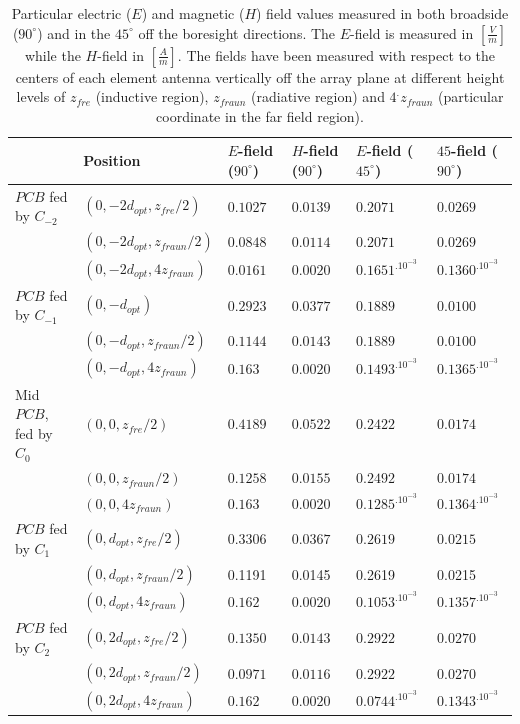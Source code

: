 \documentclass[10 pt,a4paper,twocolumn]{article}
\begin{document}
{\begin{table}[bt!]
\begin{center}
{\begin{tabular}{|m{4cm}|m{2.6cm}|m{2cm}|m{2cm}|m{2.3cm}|m{2.3cm}|}
				& Position & $E$-field ($90^\circ$) & $H$-field ($90^\circ$) & $E$-field ($45^\circ$) & $45$-field ($90^\circ$) \\
				\hline 
				$PCB$ fed by $C_{-2}$ & $(0,-2d_{opt},z_{fre}/2)$ & $0.1027$ & $0.0139$ & $0.2071$ & $0.0269$ \\ 
				 &  $(0,-2d_{opt},z_{fraun}/2)$ & $0.0848$ & $0.0114$ &$0.2071$	 & $0.0269$ \\
				 & $(0,-2d_{opt},4z_{fraun})$& $0.0161$& $0.0020$ &$0.1651^.10^{-3}$ & $0.1360^.10^{-3}$ \\
				\hline
				 $PCB$ fed by $C_{-1}$ & $(0,-d_{opt})$ & $0.2923$ & $0.0377$ & $0.1889$ & $0.0100$ \\
				 &$(0,-d_{opt},z_{fraun}/2)$ &$0.1144$ & $0.0143$&$0.1889$ & $0.0100$\\
					 & $(0,-d_{opt},4z_{fraun})$& $0.163$& $0.0020$& $0.1493^.10^{-3}$& $0.1365^.10^{-3}$\\
				\hline
				Mid $PCB$, fed by $C_{0}$ & $(0,0,z_{fre}/2)$& $0.4189$& $0.0522$& $0.2422$ & $0.0174$ \\
			 & $(0,0,z_{fraun}/2)$& $0.1258$& $0.0155$& $0.2492$& $0.0174$\\
				 & $(0,0,4z_{fraun})$ & $0.163$& $0.0020$& $0.1285^.10^{-3}$& $0.1364^.10^{-3}$\\
				\hline 
				 $PCB$ fed by $C_{1}$ & $(0,d_{opt},z_{fre}/2)$ & $0.3306$ & $0.0367$ & $0.2619$ & $0.0215$ \\
				 & $(0,d_{opt},z_{fraun}/2)$& 0.1191& 0.0145&0.2619& 0.0215\\
					 & $(0,d_{opt},4z_{fraun})$& $0.162$& $0.0020$& $0.1053^.10^{-3}$& $0.1357^.10^{-3}$\\
				\hline 
				 $PCB$ fed by $C_{2}$& $(0,2d_{opt},z_{fre}/2)$ & $0.1350$ & $0.0143$ & $0.2922$ & $0.0270$ \\
				 & $(0,2d_{opt},z_{fraun}/2)$&$0.0971$ & $0.0116$&$0.2922$ & $0.0270$\\ 
					 & $(0,2d_{opt},4z_{fraun})$& $0.162$ & $0.0020$ & $0.0744^.10^{-3}$&$0.1343^.10^{-3}$ \\
				\hline
		\end{tabular}}
		\caption{Particular electric ($E$) and magnetic ($H$) field values measured in both broadside ($90^\circ$) and in the $45^\circ$ off the boresight directions. The $E$-field is measured in $\left[\frac{V}{m}\right]$ while the $H$-field in $\left[\frac{A}{m}\right]$. The fields have been measured with respect to the centers of each element antenna vertically off the array plane at different height levels of $z_{fre}$ (inductive region), $z_{fraun}$ (radiative region) and $4^.z_{fraun}$ (particular coordinate in the far field region).}  

\end{center}
\end{table}}
\end{document}

